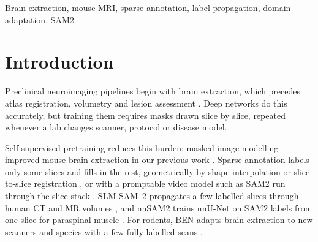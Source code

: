 \maketitle

\begin{abstract}
Brain extraction is the first step of most preclinical MRI pipelines, yet training a network for it, or adapting one to a new acquisition protocol, still requires every slice of every mouse to be outlined by hand. We ask how few annotated slices are enough when the remaining slices receive automatically propagated labels. On 20 mice from two acquisition protocols, we compare five propagators, including the video foundation model SAM2, under animal-level cross-validation. With one annotated slice per training mouse (9\% of slices), a 2.5D network trained on SAM2-propagated labels reached a Dice of 0.950 and was non-inferior to full annotation (0.946; margin 0.01, $p<0.001$), whereas training on that slice alone gave 0.891. nnU-Net behaved the same (0.958 against 0.960). A network trained on one protocol fell to 0.806 on the other; fine-tuning it with one annotated slice from each of two new mice plus SAM2 labels restored 0.928, matching fine-tuning on those mice fully annotated, while the two slices alone gave 0.866. Copying or interpolating masks was worse than no propagation, and agreement filtering helped registration but harmed SAM2.
\end{abstract}

\begin{keywords}
Brain extraction, mouse MRI, sparse annotation, label propagation, domain adaptation, SAM2
\end{keywords}

\section{Introduction}
\label{sec:intro}

Preclinical neuroimaging pipelines begin with brain extraction, which precedes atlas registration, volumetry and lesion assessment \cite{hsu2020skullstripping, defeo2021munet}. Deep networks do this accurately, but training them requires masks drawn slice by slice, repeated whenever a lab changes scanner, protocol or disease model.

Self-supervised pretraining reduces this burden; masked image modelling improved mouse brain extraction in our previous work \cite{ali2025ssl}. Sparse annotation labels only some slices \cite{cicek2016unet3d} and fills in the rest, geometrically by shape interpolation \cite{raya1990shape} or slice-to-slice registration \cite{balakrishnan2019voxelmorph}, or with a promptable video model such as SAM2 run through the slice stack \cite{ravi2024sam2, ma2024medsam, zhu2024medicalsam2}. SLM-SAM~2 propagates a few labelled slices through human CT and MR volumes \cite{chen2025slmsam2}, and nnSAM2 trains nnU-Net on SAM2 labels from one slice for paraspinal muscle \cite{zhang2025nnsam2}. For rodents, BEN adapts brain extraction to new scanners and species with a few fully labelled scans \cite{yu2022ben}.

